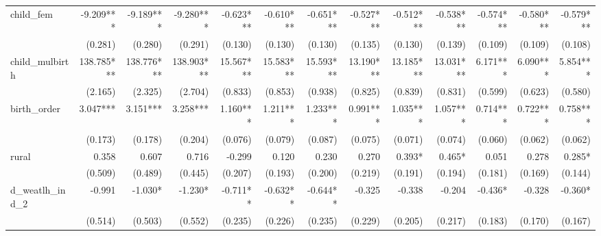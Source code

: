 \begin{tabular}{lrrrrrrrrrrrr}
child\_fem                                  &    -9.209*** &    -9.189*** &    -9.280*** &    -0.623*** &    -0.610*** &    -0.651*** &    -0.527*** &    -0.512*** &    -0.538*** &    -0.574*** &    -0.580*** &    -0.579*** \\ 
                                            &      (0.281) &      (0.280) &      (0.291) &      (0.130) &      (0.130) &      (0.130) &      (0.135) &      (0.130) &      (0.139) &      (0.109) &      (0.109) &      (0.108) \\ 
child\_mulbirth                             &   138.785*** &   138.776*** &   138.903*** &    15.567*** &    15.583*** &    15.593*** &    13.190*** &    13.185*** &    13.031*** &     6.171*** &     6.090*** &     5.854*** \\ 
                                            &      (2.165) &      (2.325) &      (2.704) &      (0.833) &      (0.853) &      (0.938) &      (0.825) &      (0.839) &      (0.831) &      (0.599) &      (0.623) &      (0.580) \\ 
birth\_order                                &     3.047*** &     3.151*** &     3.258*** &     1.160*** &     1.211*** &     1.233*** &     0.991*** &     1.035*** &     1.057*** &     0.714*** &     0.722*** &     0.758*** \\ 
                                            &      (0.173) &      (0.178) &      (0.204) &      (0.076) &      (0.079) &      (0.087) &      (0.075) &      (0.071) &      (0.074) &      (0.060) &      (0.062) &      (0.062) \\ 
rural                                       &        0.358 &        0.607 &        0.716 &       -0.299 &        0.120 &        0.230 &        0.270 &       0.393* &       0.465* &        0.051 &        0.278 &       0.285* \\ 
                                            &      (0.509) &      (0.489) &      (0.445) &      (0.207) &      (0.193) &      (0.200) &      (0.219) &      (0.191) &      (0.194) &      (0.181) &      (0.169) &      (0.144) \\ 
d\_weatlh\_ind\_2                           &       -0.991 &      -1.030* &      -1.230* &     -0.711** &     -0.632** &     -0.644** &       -0.325 &       -0.338 &       -0.204 &      -0.436* &       -0.328 &      -0.360* \\ 
                                            &      (0.514) &      (0.503) &      (0.552) &      (0.235) &      (0.226) &      (0.235) &      (0.229) &      (0.205) &      (0.217) &      (0.183) &      (0.170) &      (0.167) \\ 

\end{tabular}
